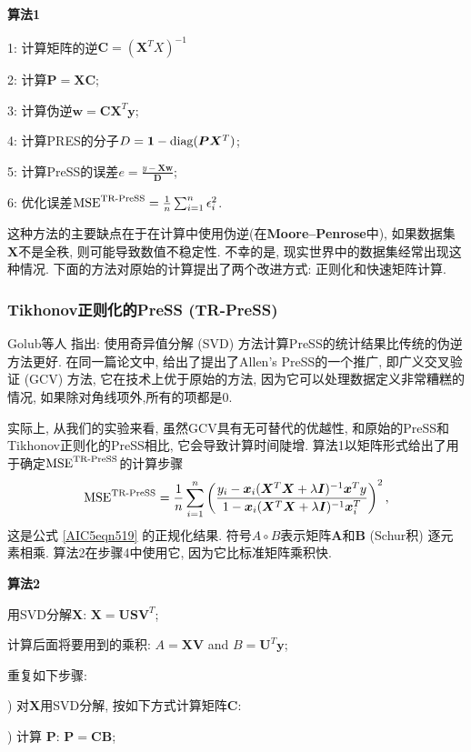 \textbf{算法1}

1: 计算矩阵的逆$\bm C= (\bm X^T X)^{-1}$

2: 计算$\bm P = \bm X\bm C$;

3: 计算伪逆$\bm w = \bm C\bm X^T\bm y$;

4: 计算PRES的分子$D = \bm 1-\textup{diag}(\bm P\bm X^T)$;

5: 计算PreSS的误差$e = \frac{y-\bm X \bm w} {\bm D} $;

6: 优化误差$\textup{MSE}^{\textup{TR-PreSS}}=\frac 1 n \sum_{i=1}^n \epsilon_i^2$.

这种方法的主要缺点在于在计算中使用伪逆(在\textbf{Moore–Penrose}中), 如果数据集$\bm X$不是全秩, 则可能导致数值不稳定性. 不幸的是, 现实世界中的数据集经常出现这种情况. 下面的方法对原始的计算提出了两个改进方式: 正则化和快速矩阵计算.
\subsubsection{Tikhonov正则化的PreSS (TR-PreSS)}
Golub等人\cite{GolubHeath1979-10292} 指出: 使用奇异值分解 (SVD) 方法计算PreSS的统计结果比传统的伪逆方法更好.
在同一篇论文中, 给出了提出了Allen's PreSS的一个推广, 即广义交叉验证 (GCV) 方法, 它在技术上优于原始的方法, 因为它可以处理数据定义非常糟糕的情况, 如果除对角线项外,所有的项都是0.

实际上, 从我们的实验来看, 虽然GCV具有无可替代的优越性, 和原始的PreSS和Tikhonov正则化的PreSS相比, 它会导致计算时间陡增. 算法1以矩阵形式给出了用于确定$\textup{MSE}^{\textup{TR-PreSS}}$的计算步骤
\begin{align}
    \textup{MSE}^{\textup{TR-PreSS}}=\frac 1 n \sum_{i=1}^n \left( \frac{y_i-\bm x_i(\bm X^T \bm X+\lambda \bm I)^{-1}\bm x^T y  }
       {1-\bm x_i(\bm X^T \bm X+\lambda \bm I)^{-1}\bm x_i^T}\right)^2,
\end{align}
这是公式 \eqref{AIC5eqn519} 的正规化结果. 符号$A\circ B$表示矩阵$\bm A$和$\bm B$ (Schur积) 逐元素相乘. 算法2在步骤4中使用它, 因为它比标准矩阵乘积快.

\textbf{算法2}

用SVD分解$\bm X$: $\bm X = \bm U\bm S\bm V^T$;

计算后面将要用到的乘积: $A = \bm X\bm V$ and $B = \bm U^T\bm y$;

重复如下步骤:

) 对$\bm X$用SVD分解, 按如下方式计算矩阵$\bm C$:

) 计算 $\bm P$: $\bm P = \bm C\bm B$;

